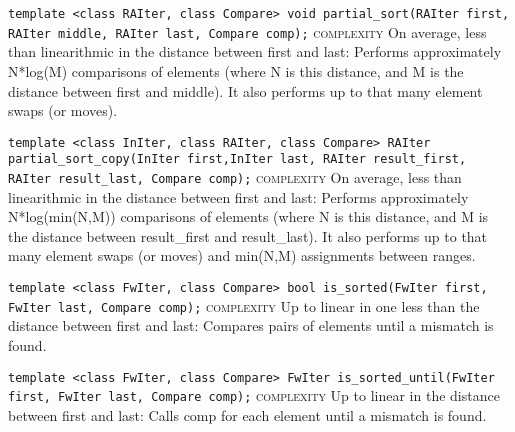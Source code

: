 \noindent{}\hspace*{0.25em}\lstinline[basicstyle=\ttfamily\color{cred}]{template <class RAIter, class Compare> void partial_sort(RAIter first, RAIter middle, RAIter last, Compare comp);} \textsc{complexity} On average, less than linearithmic in the distance between first and last: Performs approximately N*log(M) comparisons of elements (where N is this distance, and M is the distance between first and middle). It also performs up to that many element swaps (or moves).\\\vspace{-0.6em}

\noindent{}\hspace*{0.25em}\lstinline[basicstyle=\ttfamily\color{cred}]{template <class InIter, class RAIter, class Compare> RAIter partial_sort_copy(InIter first,InIter last, RAIter result_first, RAIter result_last, Compare comp);} \textsc{complexity} On average, less than linearithmic in the distance between first and last: Performs approximately N*log(min(N,M)) comparisons of elements (where N is this distance, and M is the distance between result\_first and result\_last). It also performs up to that many element swaps (or moves) and min(N,M) assignments between ranges.\\\vspace{-0.6em}

\noindent{}\hspace*{0.25em}\lstinline[basicstyle=\ttfamily\color{corange}]{template <class FwIter, class Compare> bool is_sorted(FwIter first, FwIter last, Compare comp);} \textsc{complexity} Up to linear in one less than the distance between first and last: Compares pairs of elements until a mismatch is found.\\\vspace{-0.6em}

\noindent{}\hspace*{0.25em}\lstinline[basicstyle=\ttfamily\color{corange}]{template <class FwIter, class Compare> FwIter is_sorted_until(FwIter first, FwIter last, Compare comp);} \textsc{complexity} Up to linear in the distance between first and last: Calls comp for each element until a mismatch is found.\\\vspace{-0.6em}

